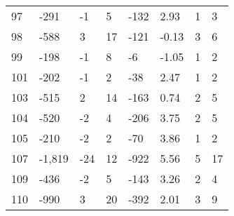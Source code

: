 \begin{appendices}
\begin{longtable}[c]{@{}llllllll@{}}
	97                       & -291                          & -1                           & 5                            & -132                     & 2.93                    & 1                    & 3                       \\
	98                       & -588                          & 3                            & 17                           & -121                     & -0.13                   & 3                    & 6                       \\
	99                       & -198                          & -1                           & 8                            & -6                       & -1.05                   & 1                    & 2                       \\
	101                      & -202                          & -1                           & 2                            & -38                      & 2.47                    & 1                    & 2                       \\
	103                      & -515                          & 2                            & 14                           & -163                     & 0.74                    & 2                    & 5                       \\
	104                      & -520                          & -2                           & 4                            & -206                     & 3.75                    & 2                    & 5                       \\
	105                      & -210                          & -2                           & 2                            & -70                      & 3.86                    & 1                    & 2                       \\
	107                      & -1,819                        & -24                          & 12                           & -922                     & 5.56                    & 5                    & 17                      \\
	109                      & -436                          & -2                           & 5                            & -143                     & 3.26                    & 2                    & 4                       \\
	110                      & -990                          & 3                            & 20                           & -392                     & 2.01                    & 3                    & 9                       \\

\end{longtable}
\end{appendices}
